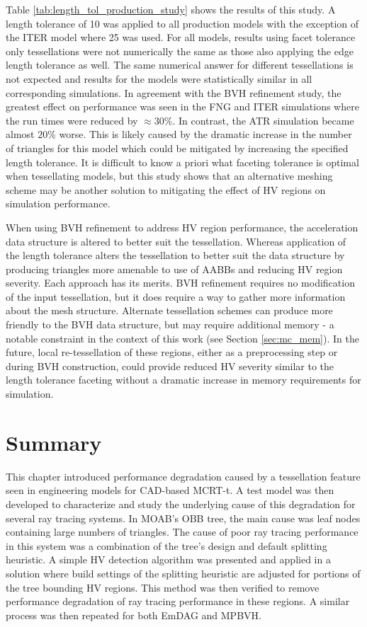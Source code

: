 Table \ref{tab:length_tol_production_study} shows the results of this study. A
length tolerance of 10 was applied to all production models with the exception
of the ITER model where 25 was used. For all models, results using facet
tolerance only tessellations were not numerically the same as those also
applying the edge length tolerance as well. The same numerical answer for
different tessellations is not expected and results for the models were
statistically similar in all corresponding simulations. In agreement with the
BVH refinement study, the greatest effect on performance was seen in the FNG and
ITER simulations where the run times were reduced by $\approx30\%$. In contrast,
the ATR simulation became almost $20\%$ worse. This is likely caused by the
dramatic increase in the number of triangles for this model which could be
mitigated by increasing the specified length tolerance. It is difficult to know
a priori what faceting tolerance is optimal when tessellating models, but this
study shows that an alternative meshing scheme may be another solution to
mitigating the effect of HV regions on simulation performance.

When using BVH refinement to address HV region performance, the acceleration
data structure is altered to better suit the tessellation. Whereas application
of the length tolerance alters the tessellation to better suit the data
structure by producing triangles more amenable to use of AABBs and reducing HV
region severity. Each approach has its merits. BVH refinement requires no
modification of the input tessellation, but it does require a way to gather more
information about the mesh structure. Alternate tessellation schemes can produce
more friendly to the BVH data structure, but may require additional memory - a
notable constraint in the context of this work (see Section
\ref{sec:mc_mem}). In the future, local re-tessellation of these regions, either
as a preprocessing step or during BVH construction, could provide reduced HV
severity similar to the length tolerance faceting without a dramatic increase in
memory requirements for simulation.

\section{Summary}

This chapter introduced performance degradation caused by a tessellation feature
seen in engineering models for CAD-based MCRT-t. A test model was then
developed to characterize and study the underlying cause of this degradation for
several ray tracing systems. In MOAB's OBB tree, the main cause was leaf nodes
containing large numbers of triangles. The cause of poor ray tracing performance
in this system was a combination of the tree's design and default splitting
heuristic. A simple HV detection algorithm was presented and applied in a
solution where build settings of the splitting heuristic are adjusted for
portions of the tree bounding HV regions. This method was then verified to
remove performance degradation of ray tracing performance in these regions. A
similar process was then repeated for both EmDAG and MPBVH.

